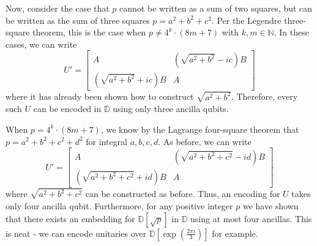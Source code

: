 \documentclass{article}
\theoremstyle{definition}
\theoremstyle{theorem}
\theoremstyle{remark}
\begin{document}
	Now, consider the case that $p$ cannot be written as a sum of two squares, but can be written as the sum of three squares $p=a^2 + b^2+c^2$. Per the Legendre three-square theorem, this is the case when $p\neq 4^k \cdot (8 m + 7)$ with $k,m\in\mathbb{N}$. In these cases, we can write
	\[
		U' = \begin{bmatrix}
		A & (\sqrt{a^2+b^2}-ic)B \\
		(\sqrt{a^2+b^2}+ic) B & A
		\end{bmatrix}
	\]
	where it has already been shown how to construct $\sqrt{a^2+b^2}$. Therefore, every such $U$ can be encoded in $\mathbb{D}$ using only three ancilla qubits.
	
	When $p= 4^k \cdot (8 m + 7)$, we know by the Lagrange four-square theorem that $p = a^2+b^2+c^2+d^2$ for integral $a,b,c,d$. As before, we can write
	\[
		U' = \begin{bmatrix}
		A & (\sqrt{a^2+b^2+c^2}-id)B \\
		(\sqrt{a^2+b^2+c^2}+id) B & A
		\end{bmatrix}
	\]
	where $\sqrt{a^2+b^2+c^2}$ can be constructed as before. Thus, an encoding for $U$ takes only four ancilla qubit. Furthermore, for any positive integer $p$ we have shown that there exists an embedding for $\mathbb{D}[\sqrt{p}]$ in $\mathbb{D}$ using at most four ancillas. This is neat - we can encode unitaries over $\mathbb{D}\left[\exp\left(\frac{2\pi i}{3}\right)\right]$ for example.
		
\end{document}
